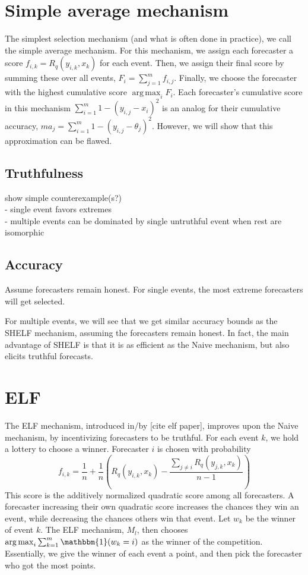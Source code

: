 \documentclass[letterpaper,12pt]{article}
\DeclareMathOperator*{\argmax}{arg\,max}
\newcommand{\1}{\mathbbm{1}}
\begin{document}
\section{Simple average mechanism}
The simplest selection mechanism (and what is often done in practice), we call the simple average mechanism. For this mechanism, we assign each forecaster a score $f_{i, k} = R_q(y_{i, k}, x_k)$ for each event. Then, we assign their final score by summing these over all events, $F_i = \sum_{j=1}^m f_{i, j}$. Finally, we choose the forecaster with the highest cumulative score $\argmax_i F_i$. Each forecaster's cumulative score in this mechanism $\sum_{i=1}^m 1 - (y_{i, j} - x_i)^2$ is an analog for their cumulative accuracy, $m a_j = \sum_{i=1}^m 1 - (y_{i, j} - \theta_j)^2$. However, we will show that this approximation can be flawed.

\subsection{Truthfulness}
show simple counterexample(s?) \\
- single event favors extremes \\
- multiple events can be dominated by single untruthful event when rest are isomorphic \\

\subsection{Accuracy}

Assume forecasters remain honest. For single events, the most extreme forecasters will get selected. 

For multiple events, we will see that we get similar accuracy bounds as the SHELF mechanism, assuming the forecasters remain honest. In fact, the main advantage of SHELF is that it is as efficient as the Naive mechanism, but also elicits truthful forecasts.

\section{ELF}
The ELF mechanism, introduced in/by [cite elf paper], improves upon the Naive mechanism, by incentivizing forecasters to be truthful. For each event $k$, we hold a lottery to choose a winner. Forecaster $i$ is chosen with probability
\[ f_{i, k} = \frac{1}{n} + \frac{1}{n} \left(R_q(y_{i, k}, x_k) - \frac{\sum_{j\neq i} R_q(y_{j, k}, x_k)}{n-1} \right)\]
This score is the additively normalized quadratic score among all forecasters. A forecaster increasing their own quadratic score increases the chances they win an event, while decreasing the chances others win that event. Let $w_k$ be the winner of event $k$. The ELF mechanism, $M_l$, then chooses $\argmax_i \sum_{k=1}^m \1(w_k = i)$ as the winner of the competition. Essentially, we give the winner of each event a point, and then pick the forecaster who got the most points.
\end{document}
